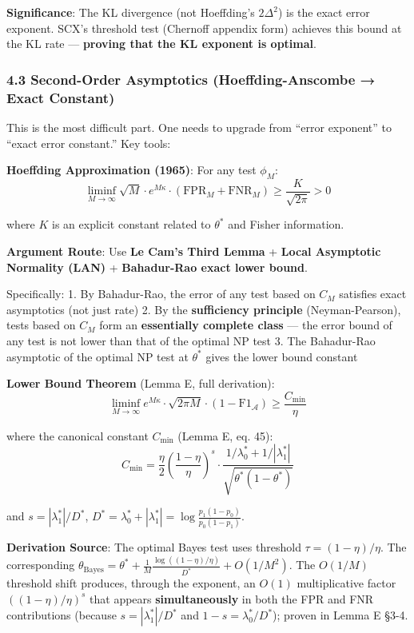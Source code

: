 \documentclass[
  12pt,
]{ctexart}
\begin{document}
\textbf{Significance}: The KL divergence (not Hoeffding's \(2\Delta^2\)) is the exact error exponent. SCX's threshold test (Chernoff appendix form) achieves this bound at the KL rate --- \textbf{proving that the KL exponent is optimal}.

\subsubsection{4.3 Second-Order Asymptotics (Hoeffding-Anscombe → Exact Constant)}\label{second-order-asymptotics-hoeffding-anscombe-exact-constant}

This is the most difficult part. One needs to upgrade from ``error exponent'' to ``exact error constant.'' Key tools:

\textbf{Hoeffding Approximation (1965)}: For any test \(\phi_M\):
\[\liminf_{M\to\infty} \sqrt{M} \cdot e^{M\kappa} \cdot (\text{FPR}_M + \text{FNR}_M) \geq \frac{K}{\sqrt{2\pi}} > 0\]

where \(K\) is an explicit constant related to \(\theta^*\) and Fisher information.

\textbf{Argument Route}: Use \textbf{Le Cam's Third Lemma} + \textbf{Local Asymptotic Normality (LAN)} + \textbf{Bahadur-Rao exact lower bound}.

Specifically:
1. By Bahadur-Rao, the error of any test based on \(C_M\) satisfies exact asymptotics (not just rate)
2. By the \textbf{sufficiency principle} (Neyman-Pearson), tests based on \(C_M\) form an \textbf{essentially complete class} --- the error bound of any test is not lower than that of the optimal NP test
3. The Bahadur-Rao asymptotic of the optimal NP test at \(\theta^*\) gives the lower bound constant

\textbf{Lower Bound Theorem} (Lemma E, full derivation):
\[\liminf_{M\to\infty} e^{M\kappa} \cdot \sqrt{2\pi M} \cdot (1 - \text{F1}_{\mathcal{A}}) \geq \frac{C_{\min}}{\eta}\]

where the canonical constant \(C_{\min}\) (Lemma E, eq. 45):
\[\boxed{C_{\min} = \frac{\eta}{2} \left(\frac{1-\eta}{\eta}\right)^{s} \cdot \frac{1/\lambda_0^* + 1/|\lambda_1^*|}{\sqrt{\theta^*(1-\theta^*)}}}\]

and \(s = |\lambda_1^*|/D^*\), \(D^* = \lambda_0^* + |\lambda_1^*| = \log\frac{p_1(1-p_0)}{p_0(1-p_1)}\).

\textbf{Derivation Source}: The optimal Bayes test uses threshold \(\tau = (1-\eta)/\eta\). The corresponding \(\theta_{\text{Bayes}} = \theta^* + \frac{1}{M}\frac{\log((1-\eta)/\eta)}{D^*} + O(1/M^2)\). The \(O(1/M)\) threshold shift produces, through the exponent, an \(O(1)\) multiplicative factor \(((1-\eta)/\eta)^s\) that appears \textbf{simultaneously} in both the FPR and FNR contributions (because \(s = |\lambda_1^*|/D^*\) and \(1-s = \lambda_0^*/D^*\)); proven in Lemma E §3-4.
\end{document}
